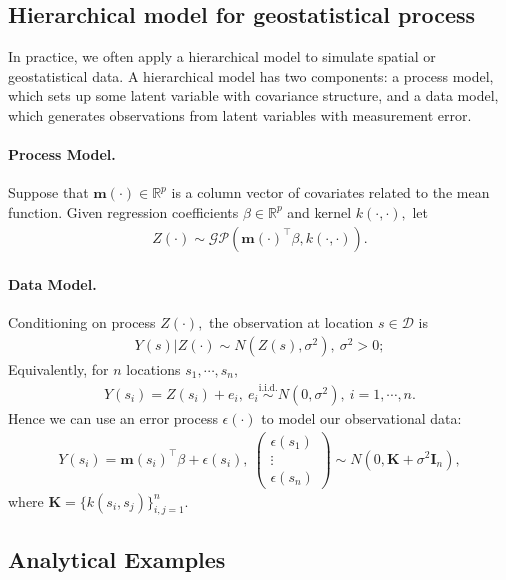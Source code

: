 \documentclass{article}
\begin{document}
\subsection{Hierarchical model for geostatistical process}
In practice, we often apply a hierarchical model to simulate spatial or geostatistical data. A hierarchical model has two components: a process model, which sets up some latent variable with covariance structure, and a data model, which generates observations from latent variables with measurement error.

\paragraph{Process Model.} Suppose that $\mathbf{m}(\cdot)\in\mathbb{R}^p$ is a column vector of covariates related to the mean function. Given regression coefficients $\beta\in\mathbb{R}^p$ and kernel $k(\cdot,\cdot),$ let
\begin{align*}
	Z(\cdot)\sim\mathcal{GP}\left(\mathbf{m}(\cdot)^\top\beta, k(\cdot,\cdot)\right).\tag{3.4}
\end{align*}
\paragraph{Data Model.} Conditioning on process $Z(\cdot),$ the observation at location $s\in\mathcal{D}$ is
\begin{align*}
	Y(s)|Z(\cdot) \sim N(Z(s), \sigma^2),\ \sigma^2>0;\tag{3.5}
\end{align*}
Equivalently, for $n$ locations $s_1,\cdots,s_n,$
\begin{align*}
	Y(s_i) = Z(s_i) + e_i,\ e_i \overset{\textrm{i.i.d.}}{\sim} N(0,\sigma^2),\ i=1,\cdots,n. \tag{3.6}
\end{align*}
Hence we can use an error process $\epsilon(\cdot)$ to model our observational data:
\begin{align*}
	Y(s_i) = \mathbf{m}(s_i)^\top\beta + \epsilon(s_i),\ \begin{pmatrix}\epsilon(s_1)\\ \vdots \\ \epsilon(s_n)\end{pmatrix}\sim N(0,\mathbf{K} + \sigma^2\mathbf{I}_n),\tag{3.7}
\end{align*}
where $\mathbf{K} = \lbrace k(s_i,s_j)\rbrace_{i,j=1}^n.$

\subsection{Analytical Examples}
\end{document}
